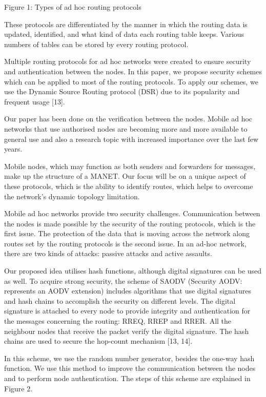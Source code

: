 \documentclass[10pt]{NSP1}
\begin{document}
Figure 1: Types of ad hoc routing protocols

These protocols are differentiated by the manner in which the routing data is updated, identified, and what kind of data each routing table keeps. Various numbers of tables can be stored by every routing protocol.

Multiple routing protocols for ad hoc networks were created to ensure security and authentication between the nodes. In this paper, we propose security schemes which can be applied to most of the routing protocols. To apply our schemes, we use the Dynamic Source Routing protocol (DSR) due to its popularity and frequent usage [13].

Our paper has been done on the verification between the nodes. Mobile ad hoc networks that use authorised nodes are becoming more and more available to general use and also a research topic with increased importance over the last few years.

Mobile nodes, which may function as both senders and forwarders for messages, make up the structure of a MANET. Our focus will be on a unique aspect of these protocols, which is the ability to identify routes, which helps to overcome the network's dynamic topology limitation.

Mobile ad hoc networks provide two security challenges. Communication between the nodes is made possible by the security of the routing protocols, which is the first issue. The protection of the data that is moving across the network along routes set by the routing protocols is the second issue. In an ad-hoc network, there are two kinds of attacks: passive attacks and active assaults.

Our proposed idea utilises hash functions, although digital signatures can be used as well. To acquire strong security, the scheme of SAODV (Security AODV: represents an AODV extension) includes algorithms that use digital signatures and hash chains to accomplish the security on different levels. The digital signature is attached to every node to provide integrity and authentication for the messages concerning the routing: RREQ, RREP and RRER. All the neighbour nodes that receive the packet verify the digital signature. The hash chains are used to secure the hop-count mechanism [13, 14].

In this scheme, we use the random number generator, besides the one-way hash function. We use this method to improve the communication between the nodes and to perform node authentication. The steps of this scheme are explained in Figure 2.
\end{document}
